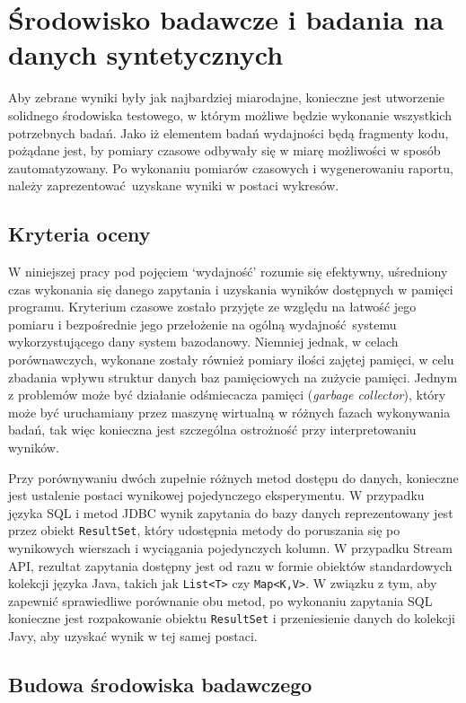 \documentclass[12pt,twoside,openright]{extarticle}
\begin{document}
\cleardoublepage
\section{Środowisko badawcze i badania na danych syntetycznych}

    Aby zebrane wyniki były jak najbardziej miarodajne, konieczne jest utworzenie solidnego środowiska testowego, w którym możliwe będzie wykonanie wszystkich potrzebnych badań. Jako iż elementem badań wydajności będą fragmenty kodu, pożądane jest, by pomiary czasowe odbywały się w miarę możliwości w sposób zautomatyzowany. Po wykonaniu pomiarów czasowych i wygenerowaniu raportu, należy zaprezentować uzyskane wyniki w postaci wykresów.

\subsection{Kryteria oceny}

    W niniejszej pracy pod pojęciem `wydajność' rozumie się efektywny, uśredniony czas wykonania się danego zapytania i uzyskania wyników dostępnych w pamięci programu. Kryterium czasowe zostało przyjęte ze względu na łatwość jego pomiaru i bezpośrednie jego przełożenie na ogólną wydajność systemu wykorzystującego dany system bazodanowy. Niemniej jednak, w celach porównawczych, wykonane zostały również pomiary ilości zajętej pamięci, w celu zbadania wpływu struktur danych baz pamięciowych na zużycie pamięci. Jednym z problemów może być działanie odśmiecacza pamięci (\textit{garbage collector}), który może być uruchamiany przez maszynę wirtualną w różnych fazach wykonywania badań, tak więc konieczna jest szczególna ostrożność przy interpretowaniu wyników.

    Przy porównywaniu dwóch zupełnie różnych metod dostępu do danych, konieczne jest ustalenie postaci wynikowej pojedynczego eksperymentu. W przypadku języka SQL i metod JDBC wynik zapytania do bazy danych reprezentowany jest przez obiekt \texttt{ResultSet}, który udostępnia metody do poruszania się po wynikowych wierszach i wyciągania pojedynczych kolumn. W przypadku Stream API, rezultat zapytania dostępny jest od razu w formie obiektów standardowych kolekcji języka Java, takich jak \texttt{List<T>} czy \texttt{Map<K,V>}. W związku z tym, aby zapewnić sprawiedliwe porównanie obu metod, po wykonaniu zapytania SQL konieczne jest rozpakowanie obiektu \texttt{ResultSet} i przeniesienie danych do kolekcji Javy, aby uzyskać wynik w tej samej postaci.


\subsection{Budowa środowiska badawczego}
\end{document}
